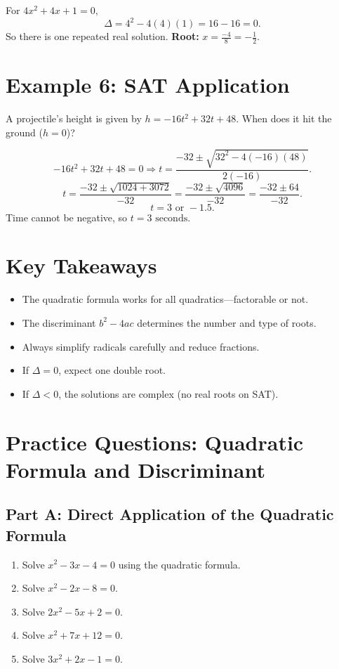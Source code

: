 \documentclass[12pt]{article}
\begin{document}
For \(4x^2 + 4x + 1 = 0,\)
\[
\Delta = 4^2 - 4(4)(1) = 16 - 16 = 0.
\]
So there is one repeated real solution.  
\textbf{Root:} \(x = \frac{-4}{8} = -\tfrac{1}{2}.\)

\section*{Example 6: SAT Application}

A projectile’s height is given by \(h = -16t^2 + 32t + 48.\)  
When does it hit the ground (\(h = 0\))?

\[
-16t^2 + 32t + 48 = 0 \Rightarrow t = \frac{-32 \pm \sqrt{32^2 - 4(-16)(48)}}{2(-16)}.
\]
\[
t = \frac{-32 \pm \sqrt{1024 + 3072}}{-32}
= \frac{-32 \pm \sqrt{4096}}{-32}
= \frac{-32 \pm 64}{-32}.
\]
\[
t = 3 \text{ or } -1.5.
\]
Time cannot be negative, so \(\boxed{t = 3\text{ seconds}}\).

\section*{Key Takeaways}
\begin{itemize}
  \item The quadratic formula works for all quadratics—factorable or not.
  \item The discriminant \(b^2 - 4ac\) determines the number and type of roots.
  \item Always simplify radicals carefully and reduce fractions.
  \item If \(\Delta = 0\), expect one double root.
  \item If \(\Delta < 0\), the solutions are complex (no real roots on SAT).
\end{itemize}

\newpage


\section*{Practice Questions: Quadratic Formula and Discriminant}

\subsection*{Part A: Direct Application of the Quadratic Formula}
\begin{enumerate}
  \item Solve \(x^2 - 3x - 4 = 0\) using the quadratic formula.
  \item Solve \(x^2 - 2x - 8 = 0.\)
  \item Solve \(2x^2 - 5x + 2 = 0.\)
  \item Solve \(x^2 + 7x + 12 = 0.\)
  \item Solve \(3x^2 + 2x - 1 = 0.\)
\end{enumerate}
\end{document}

